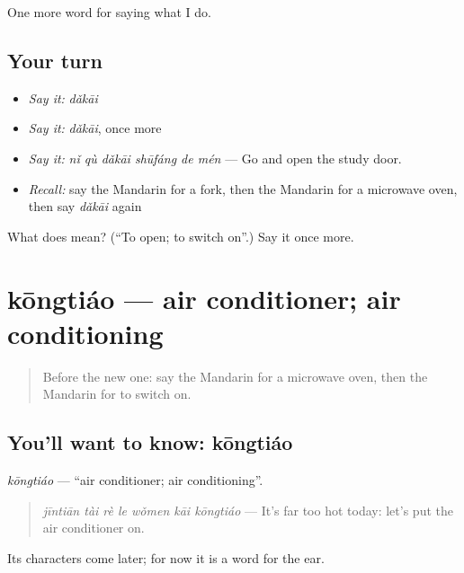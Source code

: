 \begin{grammarlens}[title={What you've built}]
One more word for saying what I do.
\end{grammarlens}

\subsection*{Your turn}
\begin{itemize}
\raggedright
  \item \emph{Say it:} \emph{dǎkāi}
  \item \emph{Say it:} \emph{dǎkāi}, once more
  \item \emph{Say it:} \emph{nǐ qù dǎkāi shūfáng de mén} — Go and open the study door.
  \item \emph{Recall:} say the Mandarin for a fork, then the Mandarin for a microwave oven, then say \emph{dǎkāi} again
\end{itemize}

\begin{tcolorbox}[breakable,colback=teal!4,colframe=teal!35!black,title={Before you move on}]
What does  mean? (\textquotedblleft{}To open; to switch on\textquotedblright{}.) Say it once more.
\end{tcolorbox}
\section[kōngtiáo]{kōngtiáo — air conditioner; air conditioning}

\label{lesson:ZH-C171-kongtiao}



\begin{quote}
Before the new one: say the Mandarin for a microwave oven, then the Mandarin for to switch on.
\end{quote}

\subsection*{You'll want to know: kōngtiáo}
\emph{kōngtiáo} — \textquotedblleft{}air conditioner; air conditioning\textquotedblright{}.

\begin{quote}
\emph{jīntiān tài rè le wǒmen kāi kōngtiáo} — It's far too hot today: let's put the air conditioner on.
\end{quote}

Its characters come later; for now it is a word for the ear.


